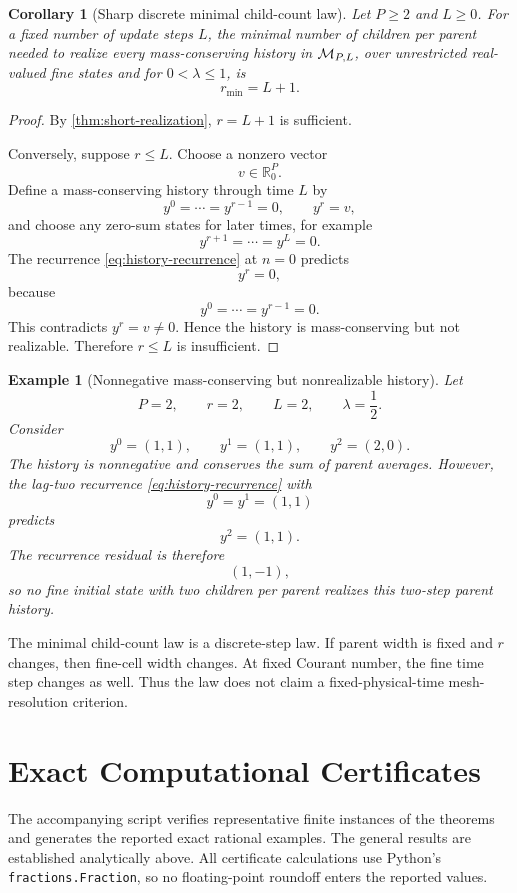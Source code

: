 \documentclass[11pt]{article}
\newtheorem{corollary}{Corollary}
\newtheorem{example}{Example}
\newcommand{\R}{\mathbb R}
\begin{document}
\begin{corollary}[Sharp discrete minimal child-count law]
\label{cor:minimal-r}
Let \(P\ge2\) and \(L\ge0\).  For a fixed number of update steps \(L\), the
minimal number of children per parent needed to realize every
mass-conserving history in \({\cal M}_{P,L}\), over unrestricted real-valued
fine states and for \(0<\lambda\le1\), is
\[
  r_{\min}=L+1.
\]
\end{corollary}

\begin{proof}
By \cref{thm:short-realization}, \(r=L+1\) is sufficient.

Conversely, suppose \(r\le L\).  Choose a nonzero vector
\[
  v\in\R_0^P.
\]
Define a mass-conserving history through time \(L\) by
\[
  y^0=\cdots=y^{r-1}=0,
  \qquad
  y^r=v,
\]
and choose any zero-sum states for later times, for example
\[
  y^{r+1}=\cdots=y^L=0.
\]
The recurrence \eqref{eq:history-recurrence} at \(n=0\) predicts
\[
  y^r=0,
\]
because
\[
  y^0=\cdots=y^{r-1}=0.
\]
This contradicts \(y^r=v\ne0\).  Hence the history is mass-conserving but
not realizable.  Therefore \(r\le L\) is insufficient.
\end{proof}

\begin{example}[Nonnegative mass-conserving but nonrealizable history]
\label{ex:nonrealizable}
Let
\[
  P=2,
  \qquad
  r=2,
  \qquad
  L=2,
  \qquad
  \lambda=\frac12.
\]
Consider
\[
  y^0=(1,1),
  \qquad
  y^1=(1,1),
  \qquad
  y^2=(2,0).
\]
The history is nonnegative and conserves the sum of parent averages.  However,
the lag-two recurrence \eqref{eq:history-recurrence} with
\[
  y^0=y^1=(1,1)
\]
predicts
\[
  y^2=(1,1).
\]
The recurrence residual is therefore
\[
  (1,-1),
\]
so no fine initial state with two children per parent realizes this
two-step parent history.
\end{example}

The minimal child-count law is a discrete-step law.  If parent width is fixed
and \(r\) changes, then fine-cell width changes.  At fixed Courant number,
the fine time step changes as well.  Thus the law does not claim a
fixed-physical-time mesh-resolution criterion.

\section{Exact Computational Certificates}
\label{sec:certificates}

The accompanying script verifies representative finite instances of the
theorems and generates the reported exact rational examples.  The general
results are established analytically above.  All certificate calculations use
Python's \texttt{fractions.Fraction}, so no floating-point roundoff enters
the reported values.
\end{document}
